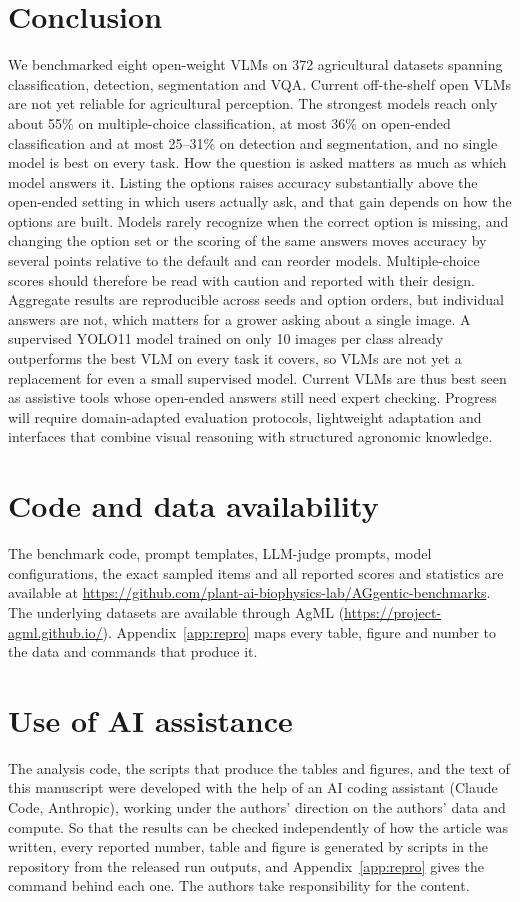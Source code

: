 \documentclass[10pt,letterpaper]{article}
\newcommand{\repo}{\url{https://github.com/plant-ai-biophysics-lab/AGgentic-benchmarks}}
\newcommand{\agmlurl}{\url{https://project-agml.github.io/}}
\begin{document}
\section{Conclusion}
\label{sec:conclusion}
We benchmarked eight open-weight VLMs on 372 agricultural datasets spanning classification, detection, segmentation and VQA. Current off-the-shelf open VLMs are not yet reliable for agricultural perception. The strongest models reach only about 55\% on multiple-choice classification, at most 36\% on open-ended classification and at most 25--31\% on detection and segmentation, and no single model is best on every task. How the question is asked matters as much as which model answers it. Listing the options raises accuracy substantially above the open-ended setting in which users actually ask, and that gain depends on how the options are built. Models rarely recognize when the correct option is missing, and changing the option set or the scoring of the same answers moves accuracy by several points relative to the default and can reorder models. Multiple-choice scores should therefore be read with caution and reported with their design. Aggregate results are reproducible across seeds and option orders, but individual answers are not, which matters for a grower asking about a single image. A supervised YOLO11 model trained on only 10 images per class already outperforms the best VLM on every task it covers, so VLMs are not yet a replacement for even a small supervised model. Current VLMs are thus best seen as assistive tools whose open-ended answers still need expert checking. Progress will require domain-adapted evaluation protocols, lightweight adaptation and interfaces that combine visual reasoning with structured agronomic knowledge.

\section*{Code and data availability}
The benchmark code, prompt templates, LLM-judge prompts, model configurations, the exact sampled items and all reported scores and statistics are available at \repo. The underlying datasets are available through AgML (\agmlurl). Appendix~\ref{app:repro} maps every table, figure and number to the data and commands that produce it.

\section*{Use of AI assistance}
The analysis code, the scripts that produce the tables and figures, and the text of this manuscript were developed with the help of an AI coding assistant (Claude Code, Anthropic), working under the authors' direction on the authors' data and compute. So that the results can be checked independently of how the article was written, every reported number, table and figure is generated by scripts in the repository from the released run outputs, and Appendix~\ref{app:repro} gives the command behind each one. The authors take responsibility for the content.
\end{document}
